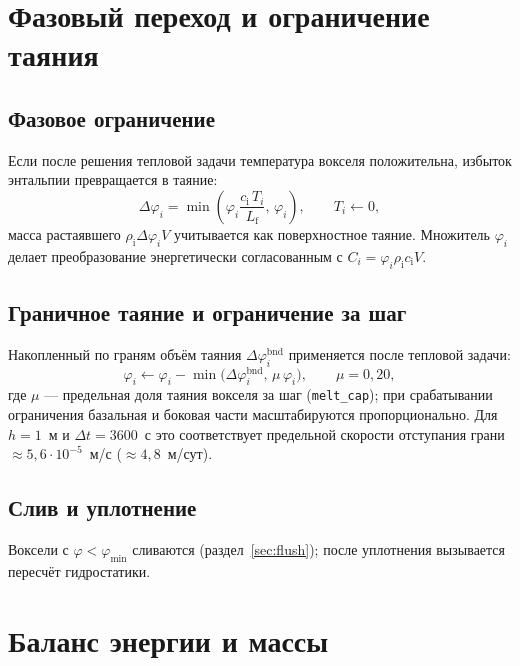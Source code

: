\documentclass[12pt,a4paper]{article}
\newcommand{\Lf}{L_{\mathrm f}}
\newcommand{\rhoi}{\rho_{\mathrm i}}
\newcommand{\ci}{c_{\mathrm i}}
\newcommand{\code}[1]{\texttt{\small #1}}
\begin{document}
\section{Фазовый переход и ограничение таяния}\label{sec:melt}

\subsection{Фазовое ограничение}
Если после решения тепловой задачи температура вокселя положительна, избыток энтальпии превращается в таяние:
\begin{equation}
\Delta\varphi_i=\min\!\left(\varphi_i\frac{\ci\,T_i}{\Lf},\,\varphi_i\right),\qquad T_i\leftarrow0,
\end{equation}
масса растаявшего $\rhoi\Delta\varphi_iV$ учитывается как поверхностное таяние. Множитель $\varphi_i$ делает преобразование энергетически согласованным с $C_i=\varphi_i\rhoi\ci V$.

\subsection{Граничное таяние и ограничение за шаг}
Накопленный по граням объём таяния $\Delta\varphi_i^{\mathrm{bnd}}$ применяется после тепловой задачи:
\begin{equation}
\varphi_i\leftarrow\varphi_i-\min\bigl(\Delta\varphi_i^{\mathrm{bnd}},\,\mu\,\varphi_i\bigr),\qquad\mu=0{,}20 ,
\end{equation}
где $\mu$ --- предельная доля таяния вокселя за шаг (\code{melt\_cap}); при срабатывании ограничения базальная и боковая части масштабируются пропорционально. Для $h=1$~м и $\Delta t=3600$~с это соответствует предельной скорости отступания грани $\approx5{,}6\cdot10^{-5}$~м/с ($\approx4{,}8$~м/сут).

\subsection{Слив и уплотнение}
Воксели с $\varphi<\varphi_{\min}$ сливаются (раздел~\ref{sec:flush}); после уплотнения вызывается пересчёт гидростатики.

\section{Баланс энергии и массы}\label{sec:ledger}
\end{document}
